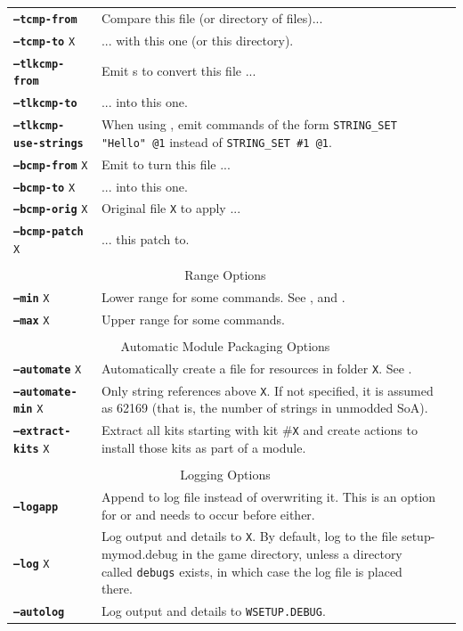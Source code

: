 \documentclass{article}
\def\ttref#1{\ahrefloc{#1}{\tt #1}}
\def\DEFINE#1{{\tt \bf #1}\label{#1}\index{#1}}
\def\t#1{{\tt #1}}
\begin{document}
\begin{tabular}{lp{10in}|p{10in}}
\DEFINE{--tcmp-from}\t{X}&	Compare this \ttref{TRA} file (or directory of \ttref{TRA} files)... \\
\DEFINE{--tcmp-to}  \t{X}&	... with this one (or this directory). \\
\DEFINE{--tlkcmp-from}\t{X}&	Emit \ttref{STRING_SET}s to convert this \ttref{TLK} file ... \\
\DEFINE{--tlkcmp-to}\t{X}&	... into this one. \\
\DEFINE{--tlkcmp-use-strings} & When using \ttref{--tlkcmp-from}, emit
commands of the form \t{STRING_SET "Hello" @1} instead of \t{STRING_SET \#1
@1}. \\
\DEFINE{--bcmp-from}  \t{X}&      Emit \ttref{APPLY_BCS_PATCH} to turn this
\ttref{BCS} file ... \\
\DEFINE{--bcmp-to}    \t{X}&      ... into this one. \\
\DEFINE{--bcmp-orig}  \t{X}&      Original file \t{X} to apply ... \\
\DEFINE{--bcmp-patch} \t{X}&      ... this patch to. \\
\\
\multicolumn{2}{c}{ \color{red} Range Options} \\
\DEFINE{--min} \t{X} & Lower range for some commands. See
\ttref{--traify-tlk}, \ttref{--tlkcmp-from} and \ttref{--string}.  \\
\DEFINE{--max} \t{X} & Upper range for some commands. \\
\\
\multicolumn{2}{c}{ \color{red} Automatic Module Packaging Options} \\
\DEFINE{--automate} \t{X}&   Automatically create a \ttref{TP2} file for resources in folder \t{X}. See \ttref{--out}. \\
\DEFINE{--automate-min} \t{X}& Only \ttref{--automate} string references above \t{X}. If not specified, it is assumed as 62169 (that is, the number of strings in unmodded SoA). \\
\DEFINE{--extract-kits} \t{X} & Extract all kits starting with kit \#\t{X}
and create \ttref{TP2} actions to install those kits as part of a module.  \\
\\
\multicolumn{2}{c}{ \color{red} Logging Options } \\

\DEFINE{--logapp} & Append to log file instead of overwriting it. This
is an option for \ttref{--log} or \ttref{--autolog} and needs to occur
before either. \\
\DEFINE{--log} \t{X}& Log output and details to \t{X}. By default, log
to the file setup-mymod.debug in the game directory, unless a
directory called \t{debugs} exists, in which case the log file is
placed there. \\

\DEFINE{--autolog} & 	Log output and details to \t{WSETUP.DEBUG}. \\
\end{tabular}
\end{document}
